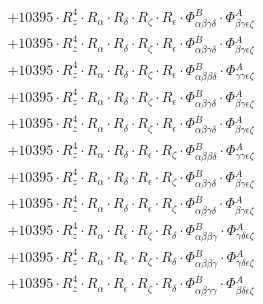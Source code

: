 \documentclass{article}
\begin{document}
\begin{subequations}
\begin{gather}
\begin{array}{c}
 \\[0.2em] 		 + 10395 \cdot R_{z}^{4} \cdot R_{\alpha{}} \cdot R_{\delta{}} \cdot R_{\zeta{}} \cdot R_{\epsilon{}} \cdot \Phi{}^{B}_{\alpha{}\beta{}\gamma{}\delta{}} \cdot \Phi{}^{A}_{\beta{}\gamma{}\epsilon{}\zeta{}} 
 \\[0.2em] 		 + 10395 \cdot R_{z}^{4} \cdot R_{\alpha{}} \cdot R_{\delta{}} \cdot R_{\zeta{}} \cdot R_{\epsilon{}} \cdot \Phi{}^{B}_{\alpha{}\beta{}\gamma{}\delta{}} \cdot \Phi{}^{A}_{\beta{}\gamma{}\epsilon{}\zeta{}} 
 \\[0.2em] 		 + 10395 \cdot R_{z}^{4} \cdot R_{\alpha{}} \cdot R_{\delta{}} \cdot R_{\zeta{}} \cdot R_{\epsilon{}} \cdot \Phi{}^{B}_{\alpha{}\beta{}\beta{}\delta{}} \cdot \Phi{}^{A}_{\gamma{}\gamma{}\epsilon{}\zeta{}} 
 \\[0.2em] 		 + 10395 \cdot R_{z}^{4} \cdot R_{\alpha{}} \cdot R_{\delta{}} \cdot R_{\zeta{}} \cdot R_{\epsilon{}} \cdot \Phi{}^{B}_{\alpha{}\beta{}\gamma{}\delta{}} \cdot \Phi{}^{A}_{\beta{}\gamma{}\epsilon{}\zeta{}} 
 \\[0.2em] 		 + 10395 \cdot R_{z}^{4} \cdot R_{\alpha{}} \cdot R_{\delta{}} \cdot R_{\zeta{}} \cdot R_{\epsilon{}} \cdot \Phi{}^{B}_{\alpha{}\beta{}\gamma{}\delta{}} \cdot \Phi{}^{A}_{\beta{}\gamma{}\epsilon{}\zeta{}} 
 \\[0.2em] 		 + 10395 \cdot R_{z}^{4} \cdot R_{\alpha{}} \cdot R_{\delta{}} \cdot R_{\epsilon{}} \cdot R_{\zeta{}} \cdot \Phi{}^{B}_{\alpha{}\beta{}\beta{}\delta{}} \cdot \Phi{}^{A}_{\gamma{}\gamma{}\epsilon{}\zeta{}} 
 \\[0.2em] 		 + 10395 \cdot R_{z}^{4} \cdot R_{\alpha{}} \cdot R_{\delta{}} \cdot R_{\epsilon{}} \cdot R_{\zeta{}} \cdot \Phi{}^{B}_{\alpha{}\beta{}\gamma{}\delta{}} \cdot \Phi{}^{A}_{\beta{}\gamma{}\epsilon{}\zeta{}} 
 \\[0.2em] 		 + 10395 \cdot R_{z}^{4} \cdot R_{\alpha{}} \cdot R_{\delta{}} \cdot R_{\epsilon{}} \cdot R_{\zeta{}} \cdot \Phi{}^{B}_{\alpha{}\beta{}\gamma{}\delta{}} \cdot \Phi{}^{A}_{\beta{}\gamma{}\epsilon{}\zeta{}} 
 \\[0.2em] 		 + 10395 \cdot R_{z}^{4} \cdot R_{\alpha{}} \cdot R_{\epsilon{}} \cdot R_{\zeta{}} \cdot R_{\delta{}} \cdot \Phi{}^{B}_{\alpha{}\beta{}\beta{}\gamma{}} \cdot \Phi{}^{A}_{\gamma{}\delta{}\epsilon{}\zeta{}} 
 \\[0.2em] 		 + 10395 \cdot R_{z}^{4} \cdot R_{\alpha{}} \cdot R_{\epsilon{}} \cdot R_{\zeta{}} \cdot R_{\delta{}} \cdot \Phi{}^{B}_{\alpha{}\beta{}\beta{}\gamma{}} \cdot \Phi{}^{A}_{\gamma{}\delta{}\epsilon{}\zeta{}} 
 \\[0.2em] 		 + 10395 \cdot R_{z}^{4} \cdot R_{\alpha{}} \cdot R_{\epsilon{}} \cdot R_{\zeta{}} \cdot R_{\delta{}} \cdot \Phi{}^{B}_{\alpha{}\beta{}\gamma{}\gamma{}} \cdot \Phi{}^{A}_{\beta{}\delta{}\epsilon{}\zeta{}} 

\end{array}
\end{gather}
\end{subequations}
\end{document}
